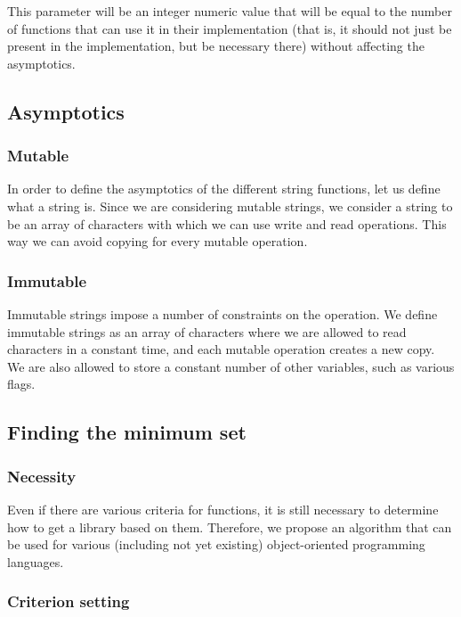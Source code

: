 \documentclass[anonymous,sigplan,review,11pt,nonacm,natbib=false]{acmart}
\begin{document}
    This parameter will be an integer numeric value that will be equal to the number of functions that can use it in their implementation (that is, it should not just be present in the implementation, but be necessary there) without affecting the asymptotics.

    \subsection{Asymptotics}

    \subsubsection{Mutable}

    In order to define the asymptotics of the different string functions, let us define what a string is. Since we are considering mutable strings, we consider a string to be an array of characters with which we can use write and read operations. This way we can avoid copying for every mutable operation.

    \subsubsection{Immutable}

    Immutable strings impose a number of constraints on the operation. We define immutable strings as an array of characters where we are allowed to read characters in a constant time, and each mutable operation creates a new copy. We are also allowed to store a constant number of other variables, such as various flags.

    \subsection{Finding the minimum set}

    \subsubsection{Necessity}

    Even if there are various criteria for functions, it is still necessary to determine how to get a library based on them. Therefore, we propose an algorithm that can be used for various (including not yet existing) object-oriented programming languages.

    \subsubsection{Criterion setting}
\end{document}
